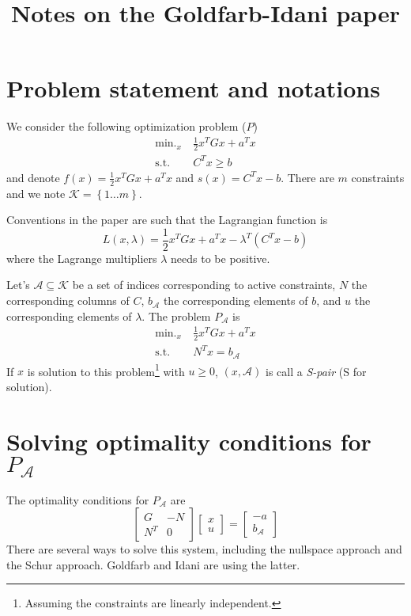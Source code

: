 \documentclass[11pt,a4paper]{article}
\newcommand{\BIN}{\begin{bmatrix}}
\newcommand{\BOUT}{\end{bmatrix}}
\DeclareMathOperator*{\minimize}{\min.}
\newcommand{\st}{\mbox{s.t.}}
\newcommand{\half}{\frac{1}{2}}
\newcommand{\act}{\mathcal{A}}
\begin{document}
\title{Notes on the Goldfarb-Idani paper}
\maketitle

\section{Problem statement and notations}
We consider the following optimization problem ($P$)
\begin{align}
	\minimize_x &\ \half x^T G x + a^T x \\
	\st &\ C^T x \geq b
\end{align}
and denote $f(x) = \half x^T G x + a^T x$ and $s(x) = C^T x - b$.
There are $m$ constraints and we note $\mathcal{K} = \left\{1 \ldots m\right\}$.

Conventions in the paper are such that the Lagrangian function is
\begin{equation}
	L(x,\lambda) = \half x^T G x + a^T x - \lambda^T(C^T x - b)
\end{equation}
where the Lagrange multipliers $\lambda$ needs to be positive.

Let's $\mathcal{A} \subseteq \mathcal{K}$ be a set of indices corresponding to active constraints, $N$ the corresponding columns of $C$, $b_\mathcal{A}$ the corresponding elements of $b$, and $u$ the corresponding elements of $\lambda$. The problem $P_\mathcal{A}$ is
\begin{align}
	\minimize_x &\ \half x^T G x + a^T x \\
	\st &\ N^T x = b_\mathcal{A}
\end{align}
If $x$ is solution to this problem\footnote{Assuming the constraints are linearly independent.} with $u\geq 0$, $(x,\act)$ is call a \emph{S-pair} (S for solution).

\section{Solving optimality conditions for $P_\act$}
The optimality conditions for $P_\act$ are
\begin{equation}
	\BIN G & -N \\ N^T & 0 \BOUT \BIN x \\ u \BOUT = \BIN -a \\ b_\act \BOUT \label{eq:optimPA}
\end{equation}
There are several ways to solve this system, including the nullspace approach and the Schur approach\cite[Chap. 16]{nocedal:book:2006}. Goldfarb and Idani are using the latter.
\end{document}
